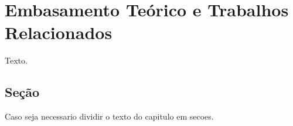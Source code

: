 \chapter{Embasamento Teórico e Trabalhos Relacionados} \label{chapter:embasamento}

Texto.

\section{Seção} \label{section:sec1}

Caso seja necessario dividir o texto do capitulo em secoes.